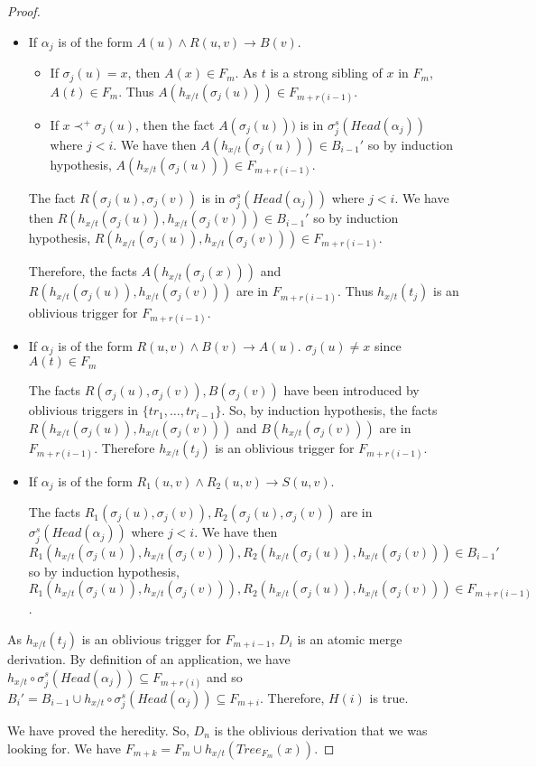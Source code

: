 \documentclass{article}
\theoremstyle{definition}
\theoremstyle{remark}
\newcommand{\Tree}{\textit{Tree}}
\begin{document}
\begin{proof}
\begin{itemize}
\item If $\alpha_j$ is of the form $A(u) \wedge R(u,v) \rightarrow B(v)$.
	\begin{itemize}
		\item If $\sigma_j(u) = x$, then $A(x) \in F_m$. As $t$ is a strong sibling of $x$ in $F_m$, $A(t)\in F_m$. Thus $A(h_{x/t}(\sigma_j(u))) \in F_{m+r(i-1)}$.
		\item If $x \prec^+ \sigma_j(u)$, then the fact $A(\sigma_j(u)))$ is in $\sigma_j^s(Head(\alpha_j))$ where $j<i$. We have then $A(h_{x/t}(\sigma_j(u)))\in B_{i-1}'$ so by induction hypothesis, $A(h_{x/t}(\sigma_j(u)))\in F_{m+r(i-1)}$. 
		\end{itemize}
The fact $R(\sigma_j(u),\sigma_j(v))$ is in $\sigma_j^s(Head(\alpha_j))$ where $j<i$. We have then $R(h_{x/t}(\sigma_j(u)),h_{x/t}(\sigma_j(v)))\in B_{i-1}'$ so by induction hypothesis, $R(h_{x/t}(\sigma_j(u)),h_{x/t}(\sigma_j(v)))\in F_{m+r(i-1)}$. 		

Therefore, the facts $A(h_{x/t}(\sigma_j(x)))$ and $R(h_{x/t}(\sigma_j(u)),h_{x/t}(\sigma_j(v)))$ are in $ F_{m+r(i-1)}$. Thus $h_{x/t}(t_j)$ is an oblivious trigger for $F_{m+r(i-1)}$.
\item If $\alpha_j$ is of the form $R(u,v) \wedge B(v) \rightarrow A(u)$. $\sigma_j(u) \neq x$ since $A(t) \in F_{m}$

The facts $R(\sigma_j(u),\sigma_j(v)),B(\sigma_j(v))$ have been introduced by oblivious triggers in $\{tr_1,\ldots,tr_{i-1}\}$. So, by induction hypothesis, the facts $R(h_{x/t}(\sigma_j(u)),h_{x/t}(\sigma_j(v)))$ and $B(h_{x/t}(\sigma_j(v)))$ are in $ F_{m+r(i-1)}$. Therefore $h_{x/t}(t_j)$ is an oblivious trigger for $F_{m+r(i-1)}$.
\item If $\alpha_j$ is of the form $R_1(u,v) \wedge R_2(u,v) \rightarrow S(u,v)$.

The facts $R_1(\sigma_j(u),\sigma_j(v)),R_2(\sigma_j(u),\sigma_j(v))$ are in $\sigma_j^s(Head(\alpha_j))$ where $j<i$. We have then $R_1(h_{x/t}(\sigma_j(u)),h_{x/t}(\sigma_j(v))),R_2(h_{x/t}(\sigma_j(u)),h_{x/t}(\sigma_j(v)))\in B_{i-1}'$ so by induction hypothesis, $R_1(h_{x/t}(\sigma_j(u)),h_{x/t}(\sigma_j(v))),R_2(h_{x/t}(\sigma_j(u)),h_{x/t}(\sigma_j(v)))\in F_{m+r(i-1)}$. 



	\end{itemize} 

As $h_{x/t}(t_j)$ is an oblivious trigger for $F_{m+i-1}$, $D_i$ is an atomic merge derivation. By definition of an application, we have $h_{x/t} \circ \sigma_j^s(Head(\alpha_j)) \subseteq F_{m+r(i)}$ and so $B_i' = B_{i-1} \cup h_{x/t} \circ \sigma_j^s(Head(\alpha_j)) 	\subseteq F_{m+i}$.
Therefore, $H(i)$ is true.


We have proved the heredity. So, $D_n$ is the oblivious derivation that we was looking for. We have $F_{m+k} = F_m \cup h_{x/t}(\Tree_{F_m}(x))$.

\end{proof}
\end{document}
